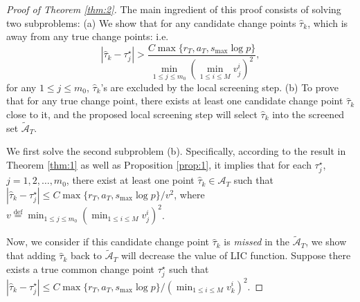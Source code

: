 \documentclass[11pt]{article}
\begin{document}
\begin{proof}[Proof of Theorem \ref{thm:2}]
The main ingredient of this proof consists of solving two subproblems: (a) We show that for any candidate change points $\widehat{\tau}_k$, which is away from any true change points: i.e.
\begin{equation*}
    |\widehat{\tau}_k - \tau_j^\star| > \frac{C\max\{r_T, a_T, s_{\max}\log p\}}{\min_{1\leq j \leq m_0}(\min_{1\leq i \leq M} v_j^i)^2},
\end{equation*}
for any $1\leq j\leq m_0$, $\widehat{\tau}_k$'s are excluded by the local screening step. (b) To prove that for any true change point, there exists at least one candidate change point $\widehat{\tau}_k$ close to it, and the proposed local screening step will select $\widehat{\tau}_k$ into the screened set $\widetilde{\mathcal{A}}_T$.

We first solve the second subproblem (b). Specifically, according to the result in Theorem \ref{thm:1} as well as Proposition \ref{prop:1}, it implies that for each $\tau_j^\star$, $j=1,2,\dots, m_0$, there exist at least one point $\widehat{\tau}_k \in \mathcal{\mathcal{A}}_T$ such that $|\widehat{\tau}_k - \tau_j^\star| \leq {C\max\{r_T, a_T, s_{\max}\log p\}}/{v^2}$, where $v \overset{\text{def}}{=} \min_{1\leq j\leq m_0}(\min_{1\leq i \leq M}v_j^i)^2$. 

Now, we consider if this candidate change point $\widehat{\tau}_k$ is \emph{missed} in the $\widetilde{\mathcal{A}}_T$, we show that adding $\widehat{\tau}_k$ back to $\widetilde{\mathcal{A}}_T$ will decrease the value of LIC function. Suppose there exists a true common change point $\tau_j^\star$ such that $|\widehat{\tau}_k - \tau_j^\star| \leq C\max\{r_T, a_T, s_{\max}\log p\}/(\min_{1\leq i \leq M}v_k^i)^2$.


\end{proof}
\end{document}
